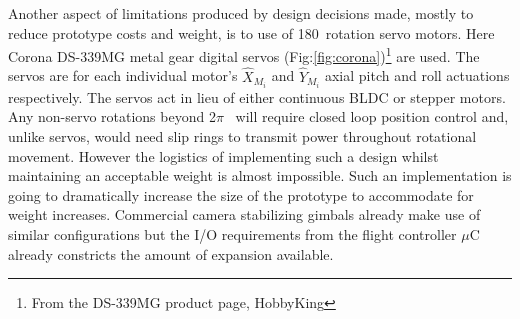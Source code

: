 \par
Another aspect of limitations produced by design decisions made, mostly to reduce prototype costs and weight, is to use of 180\textdegree ~rotation servo motors. Here Corona DS-339MG metal gear digital servos (Fig:\ref{fig:corona})\footnote{From the DS-339MG product page, HobbyKing\cite{hobbyking}} are used. The servos are for each individual motor's $\hat{X}_{M_i}$ and $\hat{Y}_{M_i}$ axial pitch and  roll actuations respectively. The servos act in lieu of either continuous BLDC or stepper motors. Any non-servo rotations beyond 2$\pi$ ~will require closed loop position control and, unlike servos, would need slip rings to transmit power throughout rotational movement. However the logistics of implementing such a design whilst maintaining an acceptable weight is almost impossible. Such an implementation is going to dramatically increase the size of the prototype to accommodate for weight increases. Commercial camera stabilizing gimbals already make use of similar configurations but the I/O requirements from the flight controller $\mu$C already constricts the amount of expansion available.
\par
